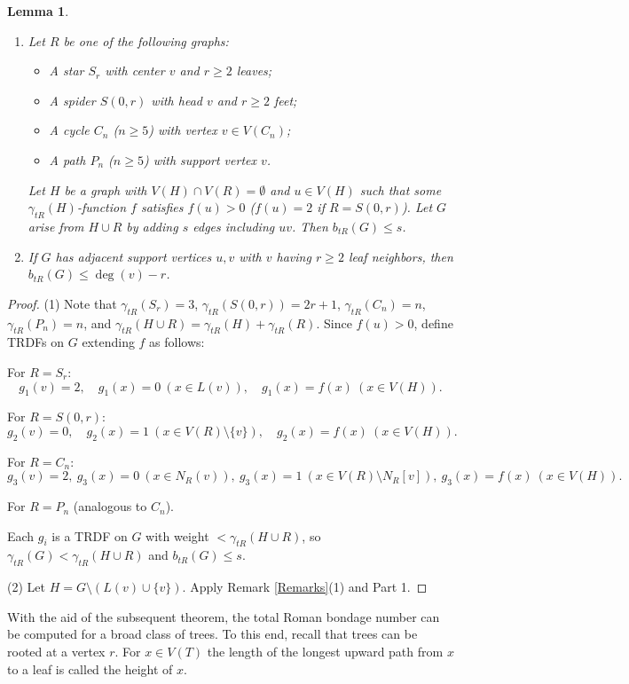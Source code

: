 \documentclass[12pt,reqno]{amsart}
\theoremstyle{plain}
\newtheorem{lemma}[theorem]{Lemma}
\numberwithin{equation}{section}
\begin{document}
\begin{lemma}\label{bt1}
\begin{enumerate}
\item Let $R$ be one of the following graphs:
 \begin{itemize}
\item[$\bullet$] A star $S_r$ with center $v$ and $r \geq 2$ leaves;
\item[$\bullet$] A spider $S(0,r)$ with head $v$ and $r \geq 2$ feet;
\item[$\bullet$] A cycle $C_n$ ($n \geq 5$) with vertex $v \in V(C_n)$;
\item[$\bullet$] A path $P_n$ ($n \geq 5$) with support vertex $v$.
 \end{itemize}
Let $H$ be a graph with $V(H) \cap V(R) = \emptyset$ and $u \in V(H)$ such that some $\gamma_{tR}(H)$-function $f$ satisfies $f(u) > 0$ ($f(u) = 2$ if $R = S(0,r)$). Let $G$ arise from $H \cup R$ by adding $s$ edges including $uv$. Then $b_{tR}(G) \leq s$.

\item If $G$ has adjacent support vertices $u,v$ with $v$ having $r \geq 2$ leaf neighbors, then $b_{tR}(G) \leq \deg(v) - r$.
\end{enumerate}
\end{lemma}
\begin{proof}
(1) Note that $\gamma_{tR}(S_r) = 3$, $\gamma_{tR}(S(0,r)) = 2r + 1$, $\gamma_{tR}(C_n) = n$, $\gamma_{tR}(P_n) = n$, and $\gamma_{tR}(H \cup R) = \gamma_{tR}(H) + \gamma_{tR}(R)$. Since $f(u) > 0$, define TRDFs on $G$ extending $f$ as follows:

For $R = S_r$:
$$g_1(v) = 2, \quad g_1(x) = 0 \ (x \in L(v)), \quad g_1(x) = f(x) \ (x \in V(H)).$$

For $R = S(0,r)$:
$$g_2(v) = 0, \quad g_2(x) = 1 \ (x \in V(R) \setminus \{v\}), \quad g_2(x) = f(x) \ (x \in V(H)).$$

For $R = C_n$:
$$g_3(v) = 2, \ g_3(x) = 0 \ (x \in N_R(v)), \ g_3(x) = 1 \ (x \in V(R) \setminus N_R[v]), \  g_3(x) = f(x) \ (x \in V(H)).$$

For $R = P_n$ (analogous to $C_n$).

Each $g_i$ is a TRDF on $G$ with weight $< \gamma_{tR}(H \cup R)$, so $\gamma_{tR}(G) < \gamma_{tR}(H \cup R)$ and $b_{tR}(G) \leq s$.

(2) Let $H = G \setminus (L(v) \cup \{v\})$. Apply Remark \ref{Remarks}(1) and Part 1.
\end{proof}

With the aid of the subsequent theorem, the total Roman bondage number can be computed for a broad class of trees. To this end, recall that trees can be rooted at a vertex $r$.  For $x\in V(T)$ the length of the longest upward path from $x$ to a leaf is called the height of $x$.  
\end{document}
